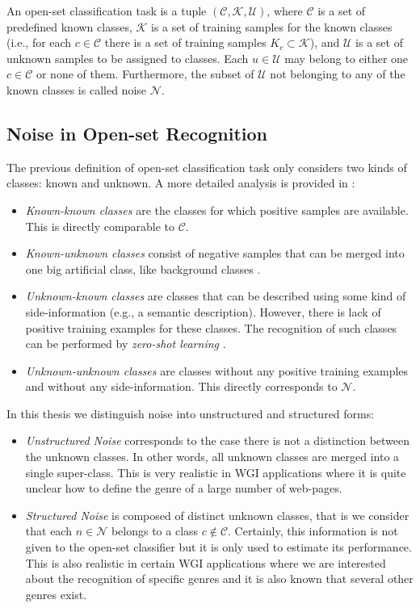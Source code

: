 An open-set classification task is a tuple $(\mathcal{C},\mathcal{K},\mathcal{U})$, where $\mathcal{C}$ is a set of predefined known classes, $\mathcal{K}$ is a set of training samples for the known classes (i.e., for each $c \in \mathcal{C}$ there is a set of training samples $K_c \subset \mathcal{K}$), and $\mathcal{U}$ is a set of unknown samples to be assigned to classes. Each $u \in \mathcal{U}$ may belong to either one $c \in \mathcal{C}$ or none of them. Furthermore, the subset of $\mathcal{U}$ not belonging to any of the known classes is called noise $\mathcal{N}$.  

\subsection{Noise in Open-set Recognition}
\label{chap:openset:sec:Noise_definition}

The previous definition of open-set classification task only considers two kinds of classes: known and unknown. A more detailed analysis is provided in \parencite{geng2018recent}:

\begin{itemize}
    \item \textit{Known-known classes} are the classes for which positive samples are available. This is directly comparable to $\mathcal{C}$.
    \item \textit{Known-unknown classes} consist of negative samples that can be merged into one big artificial class, like background classes \parencite{dhamija2018reducing}.
    \item \textit{Unknown-known classes} are classes that can be described using some kind of side-information (e.g., a semantic description). However, there is lack of positive training examples for these classes. The recognition of such classes can be performed by \textit{zero-shot learning} \parencite{palatucci2009zero}.
    \item \textit{Unknown-unknown classes} are classes without any positive training examples and without any side-information. This directly corresponds to $\mathcal{N}$. 
\end{itemize}

In this thesis we distinguish noise into unstructured and structured forms:

\begin{itemize}
    \item \textit{Unstructured Noise} corresponds to the case there is not a distinction between the unknown classes. In other words, all unknown classes are merged into a single super-class. This is very realistic in WGI applications where it is quite unclear how to define the genre of a large number of web-pages.
    \item \textit{Structured Noise} is composed of distinct unknown classes, that is we consider that each $n \in \mathcal{N}$ belongs to a class $c \notin \mathcal{C}$. Certainly, this information is not given to the open-set classifier but it is only used to estimate its performance. This is also realistic in certain WGI applications where we are interested about the recognition of specific genres and it is also known that several other genres exist.
\end{itemize}

